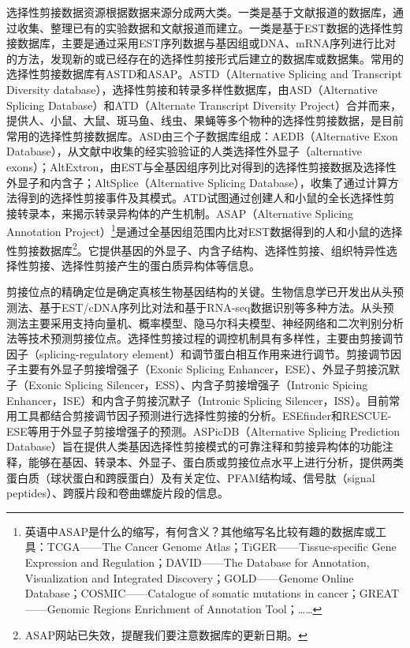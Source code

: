 \documentclass[11pt,a4paper,twoside]{book}
\begin{document}
选择性剪接数据资源根据数据来源分成两大类。一类是基于文献报道的数据库，通过收集、整理已有的实验数据和文献报道而建立。一类是基于EST数据的选择性剪接数据库，主要是通过采用EST序列数据与基因组或DNA、mRNA序列进行比对的方法，发现新的或已经存在的选择性剪接形式后建立的数据库或数据集。常用的选择性剪接数据库有ASTD和ASAP。ASTD（Alternative Splicing and Transcript Diversity database），选择性剪接和转录多样性数据库，由ASD（Alternative Splicing Database）和ATD（Alternate Transcript Diversity Project）合并而来，提供人、小鼠、大鼠、斑马鱼、线虫、果蝇等多个物种的选择性剪接数据，是目前常用的选择性剪接数据库。ASD由三个子数据库组成：AEDB（Alternative Exon Database），从文献中收集的经实验验证的人类选择性外显子（alternative exons）；AltExtron，由EST与全基因组序列比对得到的选择性剪接数据及选择性外显子和内含子；AltSplice（Alternative Splicing Database），收集了通过计算方法得到的选择性剪接事件及其模式。ATD试图通过创建人和小鼠的全长选择性剪接转录本，来揭示转录异构体的产生机制。ASAP（Alternative Splicing Annotation Project）\footnote{英语中ASAP是什么的缩写，有何含义？其他缩写名比较有趣的数据库或工具：TCGA——The Cancer Genome Atlas；TiGER——Tissue-specific Gene Expression and Regulation；DAVID——The Database for Annotation, Visualization and Integrated Discovery；GOLD——Genome Online Database；COSMIC——Catalogue of somatic mutations in cancer；GREAT——Genomic Regions Enrichment of Annotation Tool；……}是通过全基因组范围内比对EST数据得到的人和小鼠的选择性剪接数据库\footnote{ASAP网站已失效，提醒我们要注意数据库的更新日期。}。它提供基因的外显子、内含子结构、选择性剪接、组织特异性选择性剪接、选择性剪接产生的蛋白质异构体等信息。

剪接位点的精确定位是确定真核生物基因结构的关键。生物信息学已开发出从头预测法、基于EST/cDNA序列比对法和基于RNA-seq数据识别等多种方法。从头预测法主要采用支持向量机、概率模型、隐马尔科夫模型、神经网络和二次判别分析法等技术预测剪接位点。选择性剪接过程的调控机制具有多样性，主要由剪接调节因子（splicing-regulatory element）和调节蛋白相互作用来进行调节。剪接调节因子主要有外显子剪接增强子（Exonic Splicing Enhancer，ESE）、外显子剪接沉默子（Exonic Splicing Silencer，ESS）、内含子剪接增强子（Intronic Spicing Enhancer，ISE）和内含子剪接沉默子（Intronic Splicing Silencer，ISS）。目前常用工具都结合剪接调节因子预测进行选择性剪接的分析。ESEfinder和RESCUE-ESE等用于外显子剪接增强子的预测。ASPicDB（Alternative Splicing Prediction Database）旨在提供人类基因选择性剪接模式的可靠注释和剪接异构体的功能注释，能够在基因、转录本、外显子、蛋白质或剪接位点水平上进行分析，提供两类蛋白质（球状蛋白和跨膜蛋白）及有关定位、PFAM结构域、信号肽（signal peptides）、跨膜片段和卷曲螺旋片段的信息。
\end{document}
